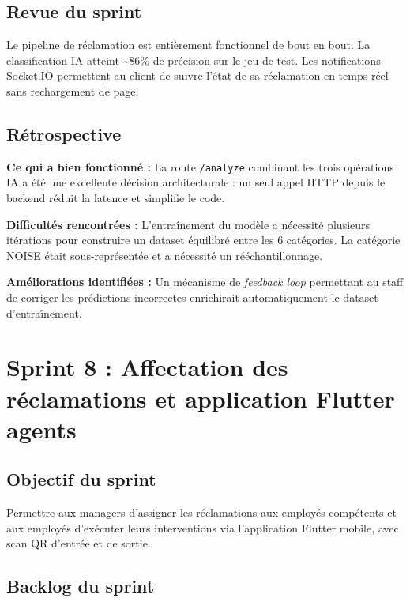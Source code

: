 \subsection{Revue du sprint}

Le pipeline de réclamation est entièrement fonctionnel de bout en bout. La classification IA atteint \textasciitilde{}86\% de précision sur le jeu de test. Les notifications Socket.IO permettent au client de suivre l'état de sa réclamation en temps réel sans rechargement de page.

\subsection{Rétrospective}

\textbf{Ce qui a bien fonctionné :} La route \texttt{/analyze} combinant les trois opérations IA a été une excellente décision architecturale : un seul appel HTTP depuis le backend réduit la latence et simplifie le code.

\textbf{Difficultés rencontrées :} L'entraînement du modèle a nécessité plusieurs itérations pour construire un dataset équilibré entre les 6 catégories. La catégorie NOISE était sous-représentée et a nécessité un rééchantillonnage.

\textbf{Améliorations identifiées :} Un mécanisme de \textit{feedback loop} permettant au staff de corriger les prédictions incorrectes enrichirait automatiquement le dataset d'entraînement.

\section{Sprint 8 : Affectation des réclamations et application Flutter agents}
\label{sec:sprint8}

\subsection{Objectif du sprint}

Permettre aux managers d'assigner les réclamations aux employés compétents et aux employés d'exécuter leurs interventions via l'application Flutter mobile, avec scan QR d'entrée et de sortie.

\subsection{Backlog du sprint}

